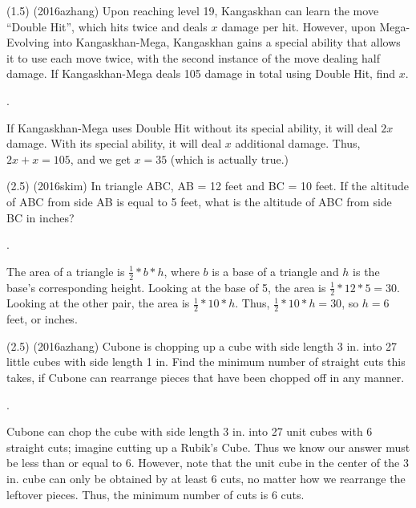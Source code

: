 \documentclass[11pt]{article}
\begin{document}
\begin{problem}
(1.5) (2016azhang) Upon reaching level 19, Kangaskhan can learn the move ``Double Hit'', which hits twice and deals $x$ damage per hit. However, upon Mega-Evolving into Kangaskhan-Mega, Kangaskhan gains a special ability that allows it to use each move twice, with the second instance of the move dealing half damage. If Kangaskhan-Mega deals 105 damage in total using Double Hit, find $x$.
\end{problem}

\begin{answer}
.
\end{answer}

\begin{solution}
If Kangaskhan-Mega uses Double Hit without its special ability, it will deal $2x$ damage. With its special ability, it will deal $x$ additional damage. Thus, $2x + x = 105$, and we get $x = \boxed{35}$ (which is actually true.)
\end{solution}

\begin{problem}
(2.5) (2016skim) In triangle ABC, AB = 12 feet and BC = 10 feet. If the altitude of ABC from side AB is equal to 5 feet, what is the altitude of ABC from side BC in inches?
\end{problem}

\begin{answer}
.
\end{answer}

\begin{solution}
The area of a triangle is $\frac{1}{2}*b*h$, where $b$ is a base of a triangle and $h$ is the base's corresponding height. Looking at the base of 5, the area is $\frac{1}{2}*12*5 = 30$. Looking at the other pair, the area is $\frac{1}{2}*10*h$. Thus, $\frac{1}{2}*10*h = 30$, so $h = 6$ feet, or  inches.
\end{solution}

\begin{problem}
(2.5) (2016azhang) Cubone is chopping up a cube with side length 3 in. into 27 little cubes with side length 1 in. Find the minimum number of straight cuts this takes, if Cubone can rearrange pieces that have been chopped off in any manner.
\end{problem}

\begin{answer}
.
\end{answer}

\begin{solution}
Cubone can chop the cube with side length 3 in. into 27 unit cubes with 6 straight cuts; imagine cutting up a Rubik's Cube. Thus we know our answer must be less than or equal to 6. However, note that the unit cube in the center of the 3 in. cube can only be obtained by at least 6 cuts, no matter how we rearrange the leftover pieces. Thus, the minimum number of cuts is 6 cuts.
\end{solution}
\end{document}
